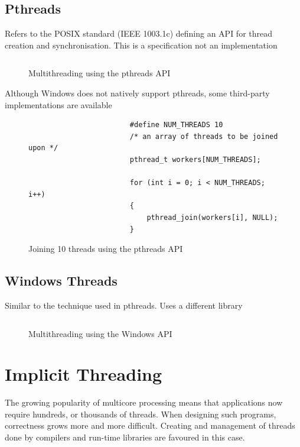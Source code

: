 \documentclass[oneside]{book}
\begin{document}
            \subsection{Pthreads}
                Refers to the POSIX standard (IEEE 1003.1c) defining an API for thread creation and synchronisation.
                This is a specification not an implementation
                \begin{figure}[H]
                    \centering
                    \inputminted{c}{code/threads/pthreads.c}
                    \caption{Multithreading using the pthreads API}
                \end{figure}
                Although Windows does not natively support pthreads, some third-party implementations are available
                \begin{figure}[H]
                    \centering
                    \begin{verbatim}
                        #define NUM_THREADS 10
                        /* an array of threads to be joined upon */
                        pthread_t workers[NUM_THREADS];

                        for (int i = 0; i < NUM_THREADS; i++)
                        {
                            pthread_join(workers[i], NULL);
                        }
                    \end{verbatim}
                    \caption{Joining 10 threads using the pthreads API}
                \end{figure}
            \subsection{Windows Threads}
                Similar to the technique used in pthreads. Uses a different library
                \begin{figure}[H]
                    \centering
                    \inputminted{c}{code/threads/windows_threads.c}
                    \caption{Multithreading using the Windows API}
                \end{figure}
        \section{Implicit Threading}
            The growing popularity of multicore processing means that applications now require hundreds,
            or thousands of threads. When designing such programs, correctness grows more and more difficult.
            Creating and management of threads done by compilers and run-time libraries are favoured in this case.
\end{document}
